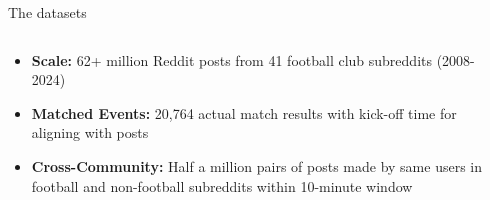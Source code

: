 \documentclass[10pt]{beamer}
\begin{document}

\begin{frame}{The datasets}

\begin{columns}
\begin{column}{0.6\textwidth}
\begin{itemize}
\item \textbf{Scale:} 62+ million Reddit posts from 41 football club subreddits (2008-2024)
\item \textbf{Matched Events:} 20,764 actual match results with kick-off time for aligning with posts
\item \textbf{Cross-Community:} Half a million pairs of posts made by same users in football and non-football subreddits within 10-minute window
\end{itemize}
\end{column}
\begin{column}{0.4\textwidth}
\centering
  \begin{table}
    \caption{Match-aligned posts overview.}
    \label{tab:match_posts}
  \end{table}
\end{column}
\end{columns}
    
\end{frame}

\end{document}
